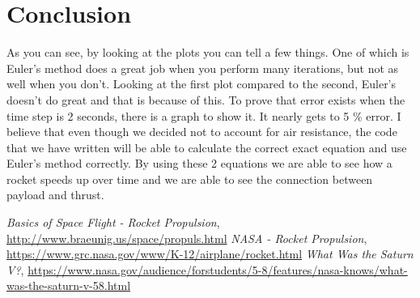 \documentclass[11pt]{article}
\begin{document}
\section{Conclusion}
As you can see, by looking at the plots you can tell a few things. One of which is Euler's method does a great job when you perform many iterations, but not as well when you don't. Looking at the first plot compared to the second, Euler's doesn't do great and that is because of this. To prove that error exists when the time step is 2 seconds, there is a graph to show it. It nearly gets to 5 \% error. I believe that even though we decided not to account for air resistance, the code that we have written will be able to calculate the correct exact equation and use Euler's method correctly. By using these 2 equations we are able to see how a rocket speeds up over time and we are able to see the connection between payload and thrust.

\newpage
\begin{thebibliography}{9}

		\textit{Basics of Space Flight - Rocket Propulsion}, \url{http://www.braeunig.us/space/propuls.html}
		\textit{NASA - Rocket Propulsion}, \url{https://www.grc.nasa.gov/www/K-12/airplane/rocket.html}
   	 	\textit{What Was the Saturn V?}, \url{https://www.nasa.gov/audience/forstudents/5-8/features/nasa-knows/what-was-the-saturn-v-58.html}

\end{thebibliography}
\end{document}
